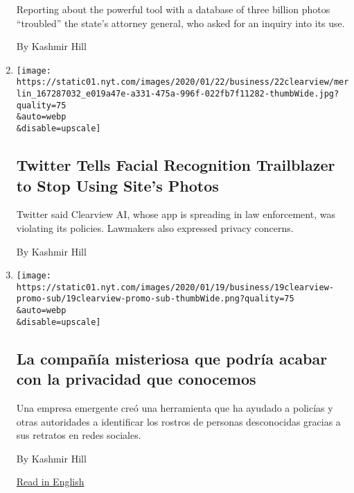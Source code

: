 \begin{enumerate}
  Reporting about the powerful tool with a database of three billion
  photos ``troubled'' the state's attorney general, who asked for an
  inquiry into its use.

  By Kashmir Hill
\item
  \href{/2020/01/22/technology/clearview-ai-twitter-letter.html}{}

  \texttt{[image: https://static01.nyt.com/images/2020/01/22/business/22clearview/merlin\_167287032\_e019a47e-a331-475a-996f-022fb7f11282-thumbWide.jpg?quality=75\\\&auto=webp\\\&disable=upscale]}

  \hypertarget{twitter-tells-facial-recognition-trailblazer-to-stop-using-sites-photos}{%
  \subsection{Twitter Tells Facial Recognition Trailblazer to Stop Using
  Site's
  Photos}\label{twitter-tells-facial-recognition-trailblazer-to-stop-using-sites-photos}}

  Twitter said Clearview AI, whose app is spreading in law enforcement,
  was violating its policies. Lawmakers also expressed privacy concerns.

  By Kashmir Hill
\item
  \href{/es/2020/01/20/espanol/negocios/clearview-reconocimiento-facial.html}{}

  \texttt{[image: https://static01.nyt.com/images/2020/01/19/business/19clearview-promo-sub/19clearview-promo-sub-thumbWide.png?quality=75\\\&auto=webp\\\&disable=upscale]}

  \hypertarget{la-compauxf1uxeda-misteriosa-que-podruxeda-acabar-con-la-privacidad-que-conocemos}{%
  \subsection{La compañía misteriosa que podría acabar con la privacidad
  que
  conocemos}\label{la-compauxf1uxeda-misteriosa-que-podruxeda-acabar-con-la-privacidad-que-conocemos}}

  Una empresa emergente creó una herramienta que ha ayudado a policías y
  otras autoridades a identificar los rostros de personas desconocidas
  gracias a sus retratos en redes sociales.

  By Kashmir Hill

  \href{https://www.nytimes.com/2020/01/18/technology/clearview-privacy-facial-recognition.html}{Read
  in English}
\end{enumerate}

